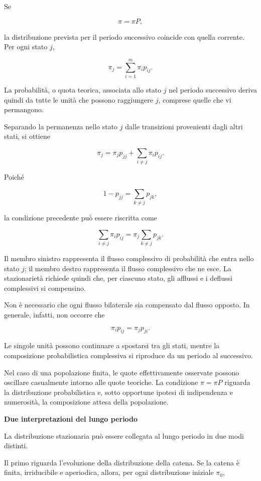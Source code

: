 Se

\[
\pi=\pi P,
\]

la distribuzione prevista per il periodo successivo coincide con quella
corrente. Per ogni stato \(j\),

\[
\pi_j
=
\sum_{i=1}^{m}\pi_i p_{ij}.
\]

La probabilit\`{a}, o quota teorica, associata allo stato \(j\) nel
periodo successivo deriva quindi da tutte le unit\`{a} che possono
raggiungere \(j\), comprese quelle che vi permangono.

Separando la permanenza nello stato \(j\) dalle transizioni provenienti
dagli altri stati, si ottiene

\[
\pi_j
=
\pi_jp_{jj}
+
\sum_{i\neq j}\pi_i p_{ij}.
\]

Poich\'{e}

\[
1-p_{jj}
=
\sum_{k\neq j}p_{jk},
\]

la condizione precedente pu\`{o} essere riscritta come

\[
\sum_{i\neq j}\pi_i p_{ij}
=
\pi_j\sum_{k\neq j}p_{jk}.
\]

Il membro sinistro rappresenta il flusso complessivo di probabilit\`{a}
che entra nello stato \(j\); il membro destro rappresenta il flusso
complessivo che ne esce. La stazionariet\`{a} richiede quindi che, per
ciascuno stato, gli afflussi e i deflussi complessivi si compensino.

Non \`{e} necessario che ogni flusso bilaterale sia compensato dal
flusso opposto. In generale, infatti, non occorre che

\[
\pi_i p_{ij}
=
\pi_j p_{ji}.
\]

Le singole unit\`{a} possono continuare a spostarsi tra gli stati,
mentre la composizione probabilistica complessiva si riproduce da un
periodo al successivo.

Nel caso di una popolazione finita, le quote effettivamente osservate
possono oscillare casualmente intorno alle quote teoriche. La
condizione \(\pi=\pi P\) riguarda la distribuzione probabilistica e,
sotto opportune ipotesi di indipendenza e numerosit\`{a}, la
composizione attesa della popolazione.

\noindent\textbf{Due interpretazioni del lungo periodo}

La distribuzione stazionaria pu\`{o} essere collegata al lungo periodo
in due modi distinti.

Il primo riguarda l'evoluzione della distribuzione della catena. Se la
catena \`{e} finita, irriducibile e aperiodica, allora, per ogni
distribuzione iniziale \(\pi_0\),

